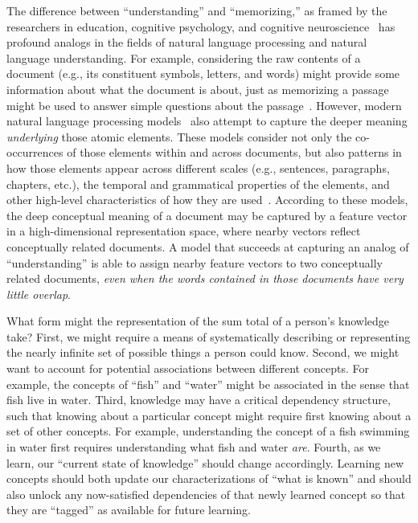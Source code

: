 \documentclass[10pt]{article}
\begin{document}
The difference between ``understanding'' and ``memorizing,'' as framed by the
researchers in education, cognitive psychology, and cognitive
neuroscience~\citep{Kato40, Gall00, ScotEtal07, HallGree08, Macl05} has
profound analogs in the fields of natural language processing and natural
language understanding. For example, considering the raw contents of a document
(e.g., its constituent symbols, letters, and words) might provide some
information about what the document is about, just as memorizing a passage
might be used to answer simple questions about the passage~\citep[e.g., whether
it might contain words related to furniture versus physics;][]{LandDuma97,
BleiEtal03, BleiLaff06}. However, modern natural language processing
models~\citep[e.g.,][]{MikoEtal13a, CerEtal18, BrowEtal20} also attempt to
capture the deeper meaning \textit{underlying} those atomic elements. These
models consider not only the co-occurrences of those elements within and across
documents, but also patterns in how those elements appear across different
scales (e.g., sentences, paragraphs, chapters, etc.), the temporal and
grammatical properties of the elements, and other high-level characteristics of
how they are used~\citep{Mann20, Mann21a}. According to these models, the deep
conceptual meaning of a document may be captured by a feature vector in a
high-dimensional representation space, where nearby vectors reflect
conceptually related documents. A model that succeeds at capturing an analog of
``understanding'' is able to assign nearby feature vectors to two conceptually
related documents, \textit{even when the words contained in those documents
have very little overlap}.

What form might the representation of the sum total of a person's knowledge
take? First, we might require a means of systematically describing or
representing the nearly infinite set of possible things a person could know.
Second, we might want to account for potential associations between different
concepts. For example, the concepts of ``fish'' and ``water'' might be
associated in the sense that fish live in water. Third, knowledge may have a
critical dependency structure, such that knowing about a particular concept
might require first knowing about a set of other concepts. For example,
understanding the concept of a fish swimming in water first requires
understanding what fish and water \textit{are}. Fourth, as we learn, our
``current state of knowledge'' should change accordingly. Learning new concepts
should both update our characterizations of ``what is known'' and should also
unlock any now-satisfied dependencies of that newly learned concept so that
they are ``tagged'' as available for future learning.
\end{document}
